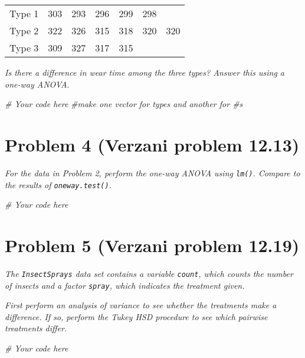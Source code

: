 \documentclass[
]{article}
\newenvironment{Shaded}{\begin{snugshade}}{\end{snugshade}}
\newcommand{\CommentTok}[1]{\textcolor[rgb]{0.56,0.35,0.01}{\textit{#1}}}
\begin{document}
\begin{longtable}[]{@{}lllllll@{}}
\toprule
& & & & & & \\
\midrule
\endhead
Type 1 & 303 & 293 & 296 & 299 & 298 & \\
Type 2 & 322 & 326 & 315 & 318 & 320 & 320 \\
Type 3 & 309 & 327 & 317 & 315 & & \\
\bottomrule
\end{longtable}

\emph{Is there a difference in wear time among the three types? Answer
this using a one-way ANOVA.}

\begin{Shaded}
\begin{Highlighting}[]
\CommentTok{\# Your code here}
\CommentTok{\#make one vector for types and another for \#s}
\end{Highlighting}
\end{Shaded}

\hypertarget{problem-4-verzani-problem-12.13}{%
\section{Problem 4 (Verzani problem
12.13)}\label{problem-4-verzani-problem-12.13}}

\emph{For the data in Problem 2, perform the one-way ANOVA using
\texttt{lm()}. Compare to the results of \texttt{oneway.test()}.}

\begin{Shaded}
\begin{Highlighting}[]
\CommentTok{\# Your code here}
\end{Highlighting}
\end{Shaded}

\hypertarget{problem-5-verzani-problem-12.19}{%
\section{Problem 5 (Verzani problem
12.19)}\label{problem-5-verzani-problem-12.19}}

\emph{The \texttt{InsectSprays} data set contains a variable
\texttt{count}, which counts the number of insects and a factor
\texttt{spray}, which indicates the treatment given.}

\emph{First perform an analysis of variance to see whether the
treatments make a difference. If so, perform the Tukey HSD procedure to
see which pairwise treatments differ.}

\begin{Shaded}
\begin{Highlighting}[]
\CommentTok{\# Your code here}
\end{Highlighting}
\end{Shaded}
\end{document}
